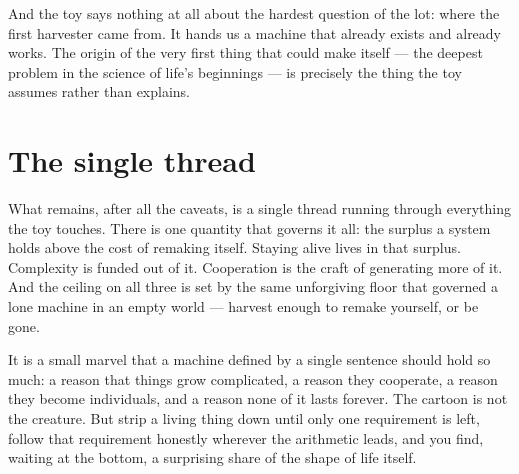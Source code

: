 \documentclass{article}
\begin{document}
And the toy says nothing at all about the hardest question of the lot: where the first harvester came from. It hands us a machine that already exists and already works. The origin of the very first thing that could make itself --- the deepest problem in the science of life's beginnings --- is precisely the thing the toy assumes rather than explains.

\section*{The single thread}

What remains, after all the caveats, is a single thread running through everything the toy touches. There is one quantity that governs it all: the surplus a system holds above the cost of remaking itself. Staying alive lives in that surplus. Complexity is funded out of it. Cooperation is the craft of generating more of it. And the ceiling on all three is set by the same unforgiving floor that governed a lone machine in an empty world --- harvest enough to remake yourself, or be gone.

It is a small marvel that a machine defined by a single sentence should hold so much: a reason that things grow complicated, a reason they cooperate, a reason they become individuals, and a reason none of it lasts forever. The cartoon is not the creature. But strip a living thing down until only one requirement is left, follow that requirement honestly wherever the arithmetic leads, and you find, waiting at the bottom, a surprising share of the shape of life itself.
\end{document}
